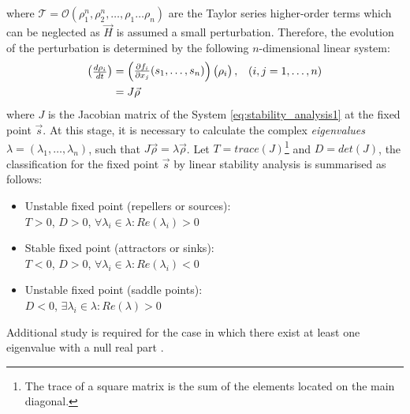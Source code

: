 where $\mathcal{T} = \mathcal{O}(\rho_1^n,\rho_2^n,\dots,\rho_1\dots \rho_n)$ are the Taylor series higher-order terms which can be neglected as $\vec{H}$ is assumed a small perturbation. Therefore, the evolution of the perturbation is determined by the following $n$-dimensional linear system:
\begin{align}
  \label{eq:stability_analysis4}
  \begin{pmatrix}
  \frac{d\rho_i}{dt} 
  \end{pmatrix}
 &=
  \begin{pmatrix}
   \frac{\partial f_i}{\partial x_j}(s_1,\dots,s_n)
  \end{pmatrix}
  \begin{pmatrix}
   \rho_i
  \end{pmatrix}, \;\;\; (i, j = 1,\dots, n)\\
 &= J \vec{\rho} \notag
\end{align}
where $J$ is the Jacobian matrix of the System \ref{eq:stability_analysis1} at the fixed point $\vec{s}$. At this stage, it is necessary to calculate the complex \emph{eigenvalues} $\lambda = (\lambda_1, \dots, \lambda_n)$, such that $J \vec{\rho} = \lambda\vec{\rho}$. Let $T = trace(J)$\footnote{The trace of a square matrix is the sum of the elements located on the main diagonal.} and $D = det(J)$, the classification for the fixed point $\vec{s}$ by linear stability analysis is summarised as follows:
\begin{itemize}
 \item Unstable fixed point (repellers or sources): \\$T > 0$, $D > 0$, $\forall \lambda_i \in \lambda: Re(\lambda_i)>0$
 \item Stable fixed point (attractors or sinks): \\$T < 0$, $D > 0$, $\forall \lambda_i \in \lambda: Re(\lambda_i)<0$
 \item Unstable fixed point (saddle points): \\$D < 0$, $\exists \lambda_i \in \lambda: Re(\lambda) > 0$
\end{itemize}
Additional study is required for the case in which there exist at least one eigenvalue with a null real part \citep{Hirsch2004}.


